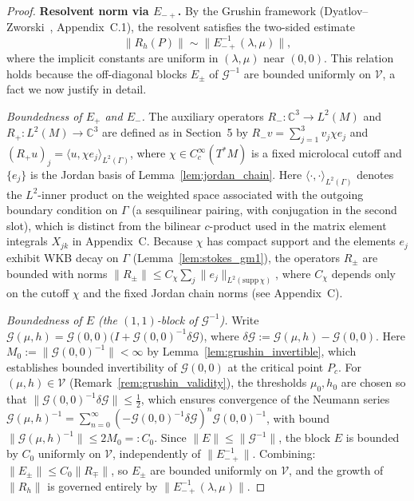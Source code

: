 \documentclass[12pt,a4paper]{amsart}
\theoremstyle{remark}
\begin{document}
\begin{proof}
\textbf{Resolvent norm via $E_{-+}$.}
By the Grushin framework (Dyatlov--Zworski~\cite{DZ19}, Appendix~C.1),
the resolvent satisfies the two-sided estimate
\[
  \|R_h(P)\| \sim \|E_{-+}^{-1}(\lambda,\mu)\|,
\]
where the implicit constants are uniform in $(\lambda,\mu)$ near $(0,0)$.
This relation holds because the off-diagonal blocks $E_\pm$ of $\mathcal{G}^{-1}$
are bounded uniformly on $\mathcal{V}$, a fact we now justify in detail.

\emph{Boundedness of $E_+$ and $E_-$.}
The auxiliary operators $R_- : \mathbb{C}^3 \to L^2(M)$ and $R_+ : L^2(M) \to \mathbb{C}^3$
are defined as in Section~5 by $R_- v = \sum_{j=1}^3 v_j \chi e_j$ and
$(R_+ u)_j = \langle u, \chi e_j \rangle_{L^2(\Gamma)}$, where $\chi \in C_c^\infty(T^*M)$
is a fixed microlocal cutoff and $\{e_j\}$ is the Jordan basis of
Lemma~\ref{lem:jordan_chain}. Here $\langle\cdot,\cdot\rangle_{L^2(\Gamma)}$ denotes
the $L^2$-inner product on the weighted space associated with the outgoing boundary
condition on $\Gamma$ (a sesquilinear pairing, with conjugation in the second slot),
which is distinct from the bilinear $c$-product used in the matrix element integrals
$X_{jk}$ in Appendix~C. Because $\chi$ has compact support and the elements
$e_j$ exhibit WKB decay on $\Gamma$ (Lemma~\ref{lem:stokes_gm1}), the operators
$R_\pm$ are bounded with norms $\|R_\pm\| \leq C_\chi \sum_j \|e_j\|_{L^2(\mathrm{supp}\,\chi)}$,
where $C_\chi$ depends only on the cutoff $\chi$ and the fixed Jordan chain norms
(see Appendix~C).

\emph{Boundedness of $E$ (the $(1,1)$-block of $\mathcal{G}^{-1}$).}
Write $\mathcal{G}(\mu,h) = \mathcal{G}(0,0)\bigl(I + \mathcal{G}(0,0)^{-1}\delta\mathcal{G}\bigr)$,
where $\delta\mathcal{G} := \mathcal{G}(\mu,h) - \mathcal{G}(0,0)$.
Here $M_0 := \|\mathcal{G}(0,0)^{-1}\| < \infty$ by Lemma~\ref{lem:grushin_invertible},
which establishes bounded invertibility of $\mathcal{G}(0,0)$ at the critical point $P_c$.
For $(\mu,h) \in \mathcal{V}$ (Remark~\ref{rem:grushin_validity}), the thresholds $\mu_0, h_0$
are chosen so that $\|\mathcal{G}(0,0)^{-1}\delta\mathcal{G}\| \leq \frac{1}{2}$,
which ensures convergence of the Neumann series
$\mathcal{G}(\mu,h)^{-1} = \sum_{n=0}^{\infty}(-\mathcal{G}(0,0)^{-1}\delta\mathcal{G})^n
\mathcal{G}(0,0)^{-1}$,
with bound $\|\mathcal{G}(\mu,h)^{-1}\| \leq 2M_0 =: C_0$. Since
$\|E\| \leq \|\mathcal{G}^{-1}\|$, the block $E$ is bounded by $C_0$ uniformly on $\mathcal{V}$,
independently of $\|E_{-+}^{-1}\|$. Combining:
$\|E_\pm\| \leq C_0\|R_\mp\|$, so $E_\pm$ are bounded uniformly on $\mathcal{V}$,
and the growth of $\|R_h\|$ is governed entirely by $\|E_{-+}^{-1}(\lambda,\mu)\|$.


\end{proof}
\end{document}
